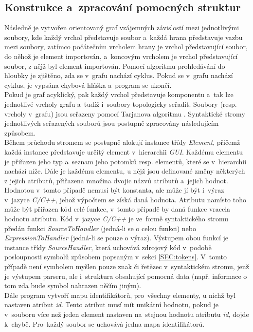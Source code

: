 \documentclass[11pt,twoside,a4paper]{book}
\begin{document}
\subsection{Konstrukce a~zpracování pomocných struktur}
Následně je vytvořen orientovaný graf vzájemných závislostí mezi jednotlivými soubory, kde každý vrchol představuje soubor a~každá hrana představuje vazbu mezi soubory, zatímco počátečním vrcholem hrany je vrchol představující soubor, do něhož je element importován, a~koncovým vrcholem je vrchol představující soubor, z nějž byl element importován. Pomocí algoritmu prohledávání do hloubky je zjištěno, zda se v~grafu nachází cyklus. Pokud se v~grafu nachází cyklus, je vypsána chybová hláška a~program se ukončí.\\
Pokud je graf acyklický, pak každý vrchol představuje komponentu a~tak lze jednotlivé vrcholy grafu a~tudíž i~soubory topologicky seřadit. Soubory (resp. vrcholy v~grafu) jsou seřazeny pomocí Tarjanova algoritmu \cite{bib:tarj}. Syntaktické stromy jednotlivých seřazených souborů jsou postupně zpracovány následujícím způsobem.\\
Během průchodu stromem se postupně alokují instance třídy \textit{Element}, přičemž každá instance představuje určitý element v~hierarchii \textit{GUI}. Každému elementu je přiřazen jeho typ a~seznam jeho potomků resp. elementů, které se v~hierarchii nachází níže. Dále je každému elementu, u nějž jsou definované změny některých z jejich atributů, přiřazena množina dvojic názvů atributů a~jejich hodnot. Hodnotou v~tomto případě nemusí být konstanta, ale může jí být i~výraz v~jazyce \textit{C/C++}, jehož výpočtem se získá daná hodnota. Atributu namísto toho může být přiřazen kód celé funkce, v~tomto případě by daná funkce vracela hodnotu atributu. Kód v~jazyce \textit{C/C++} je ve~formě syntaktického stromu předán funkci \textit{SourceToHandler} (jedná-li se o celou funkci) nebo \textit{ExpressionToHandler} (jedná-li se pouze o výraz). Výstupem obou funkcí je instance třídy \textit{SourceHandler}, která uchovává zdrojový kód v~podobě posloupnosti symbolů způsobem popsaným v~sekci \ref{SEC:tokens}. V~tomto případě není symbolem myšlen pouze znak či řetězec v~syntaktickém stromu, jenž je výstupem parseru, ale i~struktura obsahující pomocná data (např. informace o tom zda bude symbol nahrazen něčím jiným).\\
Dále program vytvoří mapu identifikátorů, pro~všechny elementy, u nichž byl nastaven atribut \textit{id}. Tento atribut musí mít unikátní hodnotu, pokud je v~souboru více než jeden element nastaven na~stejnou hodnotu atributu \textit{id}, dojde k~chybě. Pro~každý soubor se uchovává jedna mapa identifikátorů.\\
\end{document}
